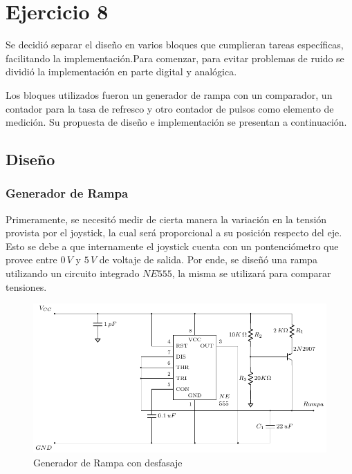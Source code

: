 \section{Ejercicio 8}

Se decidió separar el diseño en varios bloques que cumplieran tareas específicas, facilitando la implementación.Para comenzar, para evitar problemas de ruido se dividió la implementación en parte digital y analógica.\par
 Los bloques utilizados fueron un generador de rampa con un comparador, un contador para la tasa de refresco y otro contador de pulsos como elemento de medición. Su propuesta de diseño e implementación se presentan a continuación. \par

\subsection{Diseño}

\subsubsection{Generador de Rampa}

Primeramente, se necesitó medir de cierta manera la variación en la tensión provista por el joystick, la cual será proporcional a su posición respecto del eje. Esto se debe a que internamente el joystick cuenta con un pontenciómetro que provee entre $0\,V$ y $5\,V$ de voltaje de salida. Por ende, se diseñó una rampa utilizando un circuito integrado $NE555$, la misma se utilizará para comparar tensiones. \par

\begin{figure}[H]
\centering
\includegraphics[scale=0.8]{Ejercicio8/Circuitos/Generador_de_rampa.pdf}
\caption{Generador de Rampa con desfasaje}
\label{fig:Generador_de_rampa}
\end{figure}

